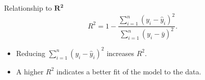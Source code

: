 \documentclass{beamer}
\begin{document}
\begin{frame}{Relationship to \(\boldsymbol{R^2}\)}
\[
R^2 = 1 - \frac{\sum_{i=1}^{n} (y_i - \hat{y}_i)^2}
{\sum_{i=1}^{n} (y_i - \bar{y})^2}.
\]

\begin{itemize}
  \item Reducing \(\sum_{i=1}^{n} (y_i - \hat{y}_i)^2\) increases \(R^2\).
  \item A higher \(R^2\) indicates a better fit of the model to the data.
\end{itemize}
\end{frame}
\end{document}
